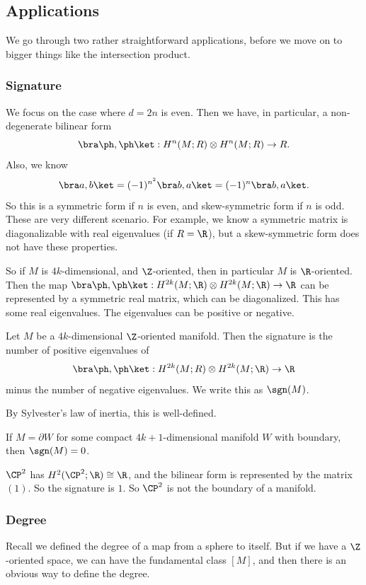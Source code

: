 \documentclass[a4paper]{article}
\theoremstyle{definition}
\begin{document}
\subsection{Applications}
We go through two rather straightforward applications, before we move on to bigger things like the intersection product.

\subsubsection*{Signature}
We focus on the case where $d = 2n$ is even. Then we have, in particular, a non-degenerate bilinear form
\[
  \bra \ph, \ph\ket : H^n(M; R) \otimes H^n(M; R) \to R.
\]
Also, we know
\[
  \bra a, b\ket = (-1)^{n^2}\bra b, a\ket = (-1)^n \bra b, a \ket.
\]
So this is a symmetric form if $n$ is even, and skew-symmetric form if $n$ is odd. These are very different scenario. For example, we know a symmetric matrix is diagonalizable with real eigenvalues (if $R = \R$), but a skew-symmetric form does not have these properties.

So if $M$ is $4k$-dimensional, and $\Z$-oriented, then in particular $M$ is $\R$-oriented. Then the map $\bra \ph, \ph\ket : H^{2k}(M; \R) \otimes H^{2k}(M; \R) \to \R$ can be represented by a symmetric real matrix, which can be diagonalized. This has some real eigenvalues. The eigenvalues can be positive or negative.
\begin{defi}
  Let $M$ be a $4k$-dimensional $\Z$-oriented manifold. Then the signature is the number of positive eigenvalues of
  \[
    \bra \ph, \ph\ket: H^{2k}(M; R) \otimes H^{2k}(M; \R) \to \R
  \]
  minus the number of negative eigenvalues. We write this as $\sgn(M)$.
\end{defi}
By Sylvester's law of inertia, this is well-defined.

\begin{fact}
  If $M = \partial W$ for some compact $4k + 1$-dimensional manifold $W$ with boundary, then $\sgn(M) = 0$.
\end{fact}

\begin{eg}
  $\CP^2$ has $H^2(\CP^2; \R) \cong \R$, and the bilinear form is represented by the matrix $(1)$. So the signature is $1$. So $\CP^2$ is not the boundary of a manifold.
\end{eg}

\subsubsection*{Degree}
Recall we defined the degree of a map from a sphere to itself. But if we have a $\Z$-oriented space, we can have the fundamental class $[M]$, and then there is an obvious way to define the degree.
\end{document}
